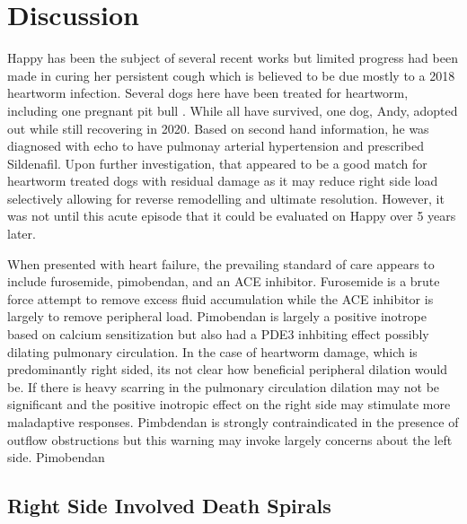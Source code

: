 \section{Discussion}



Happy has been the subject of several recent works
but limited progress had been made in curing her persistent
cough which is believed to be due mostly to a 2018 heartworm infection.
Several dogs here have been treated for heartworm, including
one pregnant pit bull \cite{mmarchywka-MJM-2021-003-v0.50rg}.
 While all have survived, one dog, Andy, adopted
out while still recovering in 2020. Based on second hand information, 
he was diagnosed with echo to have pulmonay arterial hypertension
and prescribed Sildenafil. Upon further investigation, that appeared
to be a good match for heartworm treated dogs with residual
damage as it may reduce right side load selectively allowing
for reverse remodelling and ultimate resolution. However, it was
not until this acute episode that it could be evaluated on Happy 
over 5 years later. 

When presented with heart failure, the prevailing standard of
care appears to include furosemide, pimobendan, and an ACE inhibitor.
Furosemide is a brute force attempt to remove excess fluid
accumulation while the ACE inhibitor is largely to remove
peripheral load. Pimobendan is largely a positive inotrope
based on calcium sensitization
\cite{PMID7511757}
 but also had a PDE3 inhbiting
\cite{Pichayapaiboon_Tantisuwat_Boonpala_Pharmacodynamics_Pharmacokinetics_2021}
effect possibly dilating pulmonary circulation.  In the case
of heartworm damage, which is predominantly right sided,
its not clear how beneficial peripheral dilation would be.
If there is heavy scarring in the pulmonary circulation
dilation may not be significant and the positive inotropic
effect on the right side may stimulate more maladaptive responses.
Pimbdendan is strongly contraindicated in the presence of outflow
obstructions but this warning may invoke largely concerns about
the left side. 
Pimobendan 


\subsection{Right Side Involved Death Spirals }


